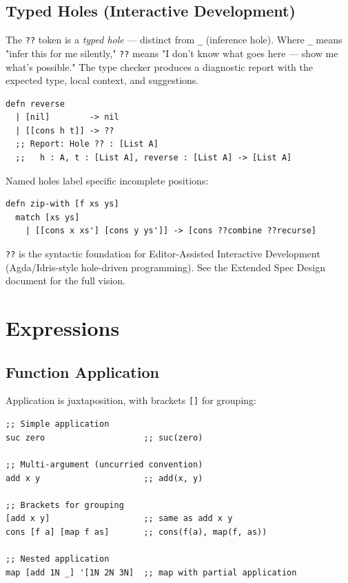\documentclass[11pt]{article}
\begin{document}
\subsection{Typed Holes (Interactive Development)}
\label{sec:orgcc25878}

The \texttt{??} token is a \emph{typed hole} --- distinct from \texttt{\_} (inference hole). Where
\texttt{\_} means "infer this for me silently," \texttt{??} means "I don't know what goes here
--- show me what's possible." The type checker produces a diagnostic report with
the expected type, local context, and suggestions.

\begin{verbatim}
defn reverse
  | [nil]        -> nil
  | [[cons h t]] -> ??
  ;; Report: Hole ?? : [List A]
  ;;   h : A, t : [List A], reverse : [List A] -> [List A]
\end{verbatim}

Named holes label specific incomplete positions:

\begin{verbatim}
defn zip-with [f xs ys]
  match [xs ys]
    | [[cons x xs'] [cons y ys']] -> [cons ??combine ??recurse]
\end{verbatim}

\texttt{??} is the syntactic foundation for Editor-Assisted Interactive Development
(Agda/Idris-style hole-driven programming). See the Extended Spec Design
document for the full vision.
\section{Expressions}
\label{sec:org241c603}

\subsection{Function Application}
\label{sec:orgc4be96d}

Application is juxtaposition, with brackets \texttt{[]} for grouping:

\begin{verbatim}
;; Simple application
suc zero                    ;; suc(zero)

;; Multi-argument (uncurried convention)
add x y                     ;; add(x, y)

;; Brackets for grouping
[add x y]                   ;; same as add x y
cons [f a] [map f as]       ;; cons(f(a), map(f, as))

;; Nested application
map [add 1N _] '[1N 2N 3N]  ;; map with partial application
\end{verbatim}
\end{document}
